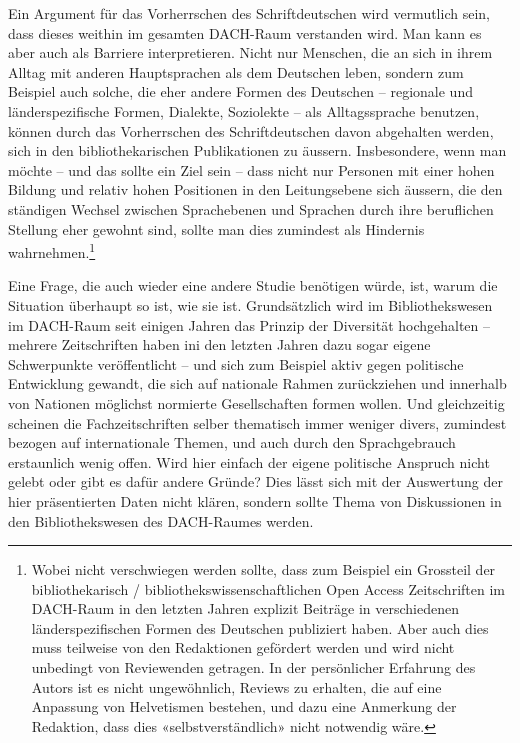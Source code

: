 \documentclass[a4paper,
fontsize=11pt,
oneside,
numbers=noperiodatend,
parskip=half-,
bibliography=totoc,
final
]{scrartcl}
\begin{document}
Ein Argument für das Vorherrschen des Schriftdeutschen wird vermutlich
sein, dass dieses weithin im gesamten DACH-Raum verstanden wird. Man
kann es aber auch als Barriere interpretieren. Nicht nur Menschen, die
an sich in ihrem Alltag mit anderen Hauptsprachen als dem Deutschen
leben, sondern zum Beispiel auch solche, die eher andere Formen des
Deutschen -- regionale und länderspezifische Formen, Dialekte,
Soziolekte -- als Alltagssprache benutzen, können durch das Vorherrschen
des Schriftdeutschen davon abgehalten werden, sich in den
bibliothekarischen Publikationen zu äussern. Insbesondere, wenn man
möchte -- und das sollte ein Ziel sein -- dass nicht nur Personen mit
einer hohen Bildung und relativ hohen Positionen in den Leitungsebene
sich äussern, die den ständigen Wechsel zwischen Sprachebenen und
Sprachen durch ihre beruflichen Stellung eher gewohnt sind, sollte man
dies zumindest als Hindernis wahrnehmen.\footnote{Wobei nicht
  verschwiegen werden sollte, dass zum Beispiel ein Grossteil der
  bibliothekarisch / bibliothekswissenschaftlichen Open Access
  Zeitschriften im DACH-Raum in den letzten Jahren explizit Beiträge in
  verschiedenen länderspezifischen Formen des Deutschen publiziert
  haben. Aber auch dies muss teilweise von den Redaktionen gefördert
  werden und wird nicht unbedingt von Reviewenden getragen. In der
  persönlicher Erfahrung des Autors ist es nicht ungewöhnlich, Reviews
  zu erhalten, die auf eine Anpassung von Helvetismen bestehen, und dazu
  eine Anmerkung der Redaktion, dass dies «selbstverständlich» nicht
  notwendig wäre.}

Eine Frage, die auch wieder eine andere Studie benötigen würde, ist,
warum die Situation überhaupt so ist, wie sie ist. Grundsätzlich wird im
Bibliothekswesen im DACH-Raum seit einigen Jahren das Prinzip der
Diversität hochgehalten -- mehrere Zeitschriften haben ini den letzten
Jahren dazu sogar eigene Schwerpunkte veröffentlicht -- und sich zum
Beispiel aktiv gegen politische Entwicklung gewandt, die sich auf
nationale Rahmen zurückziehen und innerhalb von Nationen möglichst
normierte Gesellschaften formen wollen. Und gleichzeitig scheinen die
Fachzeitschriften selber thematisch immer weniger divers, zumindest
bezogen auf internationale Themen, und auch durch den Sprachgebrauch
erstaunlich wenig offen. Wird hier einfach der eigene politische
Anspruch nicht gelebt oder gibt es dafür andere Gründe? Dies lässt sich
mit der Auswertung der hier präsentierten Daten nicht klären, sondern
sollte Thema von Diskussionen in den Bibliothekswesen des DACH-Raumes
werden.
\end{document}
